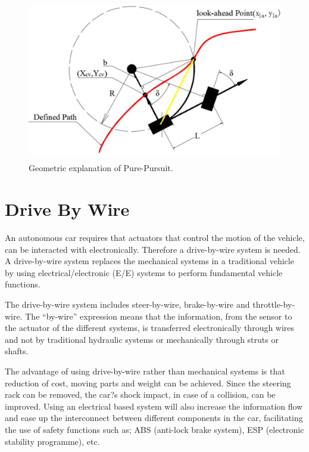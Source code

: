 \begin{figure}[h]
\centering
\includegraphics[height=2.8in]{figs/ch3/purepursuit}
\caption{Geometric explanation of Pure-Pursuit.}
\label{fig:purepursuit}
\end{figure}

\section{Drive By Wire}

An autonomous car requires that actuators that control the motion of the vehicle, can be interacted with electronically. Therefore a drive-by-wire system is needed. A drive-by-wire system replaces the mechanical systems in a traditional vehicle by using electrical/electronic (E/E) systems to perform fundamental vehicle functions.

The drive-by-wire system includes steer-by-wire, brake-by-wire and throttle-by-wire. The ``by-wire'' expression means that the information, from the sensor to the actuator of the different systems, is transferred electronically through wires and not by traditional hydraulic systems or mechanically through struts or shafts.

The advantage of using drive-by-wire rather than mechanical systems is that reduction of cost, moving parts and weight can be achieved. Since the steering rack can be removed, the car?s shock impact, in case of a collision, can be improved. Using an electrical based system will also increase the information flow and ease up the interconnect between different components in the car, facilitating the use of safety functions such as; ABS (anti-lock brake system), ESP (electronic stability programme), etc.


%
%

